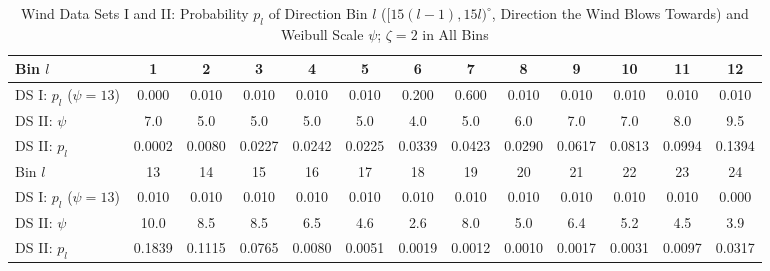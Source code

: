 \documentclass[journal,twoside]{IEEEtran}
\begin{document}
\begin{table}[!t]
\centering
\caption{Wind Data Sets I and II: Probability $p_l$ of Direction Bin $l$ ($[15(l-1),15l)^\circ$, Direction the Wind Blows Towards) and Weibull Scale $\psi$; $\zeta=2$ in All Bins}
\label{tab:wind}
\scriptsize\setlength{\tabcolsep}{3.2pt}
\begin{tabular}{l*{12}{c}}
\toprule
Bin $l$ & 1 & 2 & 3 & 4 & 5 & 6 & 7 & 8 & 9 & 10 & 11 & 12 \\
\midrule
DS I: $p_l$ ($\psi=13$) & 0.000 & 0.010 & 0.010 & 0.010 & 0.010 & 0.200 & 0.600 & 0.010 & 0.010 & 0.010 & 0.010 & 0.010 \\
DS II: $\psi$ & 7.0 & 5.0 & 5.0 & 5.0 & 5.0 & 4.0 & 5.0 & 6.0 & 7.0 & 7.0 & 8.0 & 9.5 \\
DS II: $p_l$ & 0.0002 & 0.0080 & 0.0227 & 0.0242 & 0.0225 & 0.0339 & 0.0423 & 0.0290 & 0.0617 & 0.0813 & 0.0994 & 0.1394 \\
\midrule
Bin $l$ & 13 & 14 & 15 & 16 & 17 & 18 & 19 & 20 & 21 & 22 & 23 & 24 \\
\midrule
DS I: $p_l$ ($\psi=13$) & 0.010 & 0.010 & 0.010 & 0.010 & 0.010 & 0.010 & 0.010 & 0.010 & 0.010 & 0.010 & 0.010 & 0.000 \\
DS II: $\psi$ & 10.0 & 8.5 & 8.5 & 6.5 & 4.6 & 2.6 & 8.0 & 5.0 & 6.4 & 5.2 & 4.5 & 3.9 \\
DS II: $p_l$ & 0.1839 & 0.1115 & 0.0765 & 0.0080 & 0.0051 & 0.0019 & 0.0012 & 0.0010 & 0.0017 & 0.0031 & 0.0097 & 0.0317 \\
\bottomrule
\end{tabular}
\end{table}
\end{document}
